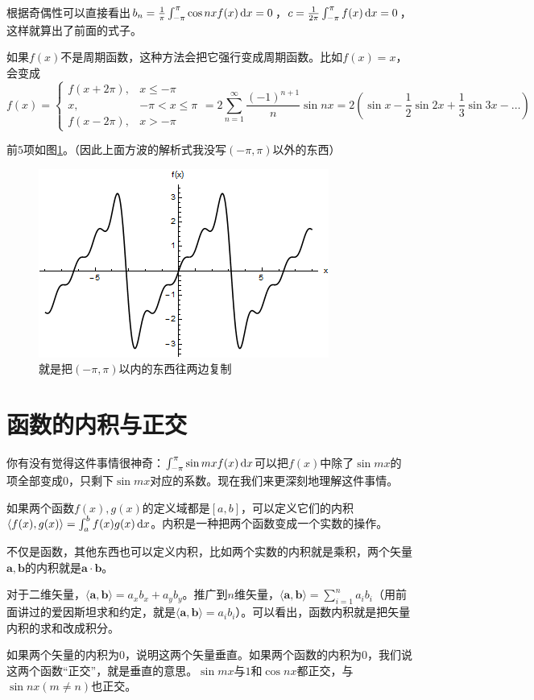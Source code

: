 根据奇偶性可以直接看出$b_n=\frac{1}{\pi} \int_{-\pi}^{\pi} \cos n x f(x) \mathop{}\!\mathrm{d} x=0$，$c=\frac{1}{2 \pi} \int_{-\pi}^{\pi} f(x) \mathop{}\!\mathrm{d} x=0$，这样就算出了前面的式子。

如果$f(x)$不是周期函数，这种方法会把它强行变成周期函数。比如$f(x)=x$，会变成
\begin{equation*}
f(x)=\begin{cases} f(x+2 \pi), &x \le -\pi \\ x, &-\pi<x \le \pi \\ f(x-2 \pi), &x>-\pi \end{cases}=2 \sum_{n=1}^{\infty} \frac{(-1)^{n+1}}{n} \sin n x=2(\sin x-\frac{1}{2} \sin 2 x+\frac{1}{3} \sin 3 x-\dots)
\end{equation*}

前$5$项如图\ref{fig-trigo-x}。（因此上面方波的解析式我没写$(-\pi,\pi)$以外的东西）
\begin{figure}[htb]
\centering
\includegraphics[width=0.33\linewidth]{fig/trigo-x.png}
\caption{就是把$(-\pi,\pi)$以内的东西往两边复制}
\label{fig-trigo-x}
\end{figure}
\section{函数的内积与正交}
你有没有觉得这件事情很神奇：$\int_{-\pi}^{\pi} \sin m x f(x) \mathop{}\!\mathrm{d} x$可以把$f(x)$中除了$\sin m x$的项全部变成$0$，只剩下$\sin m x$对应的系数。现在我们来更深刻地理解这件事情。

如果两个函数$f(x),g(x)$的定义域都是$[a,b]$，可以定义它们的内积$\langle f(x),g(x) \rangle=\int_a^b f(x) g(x) \mathop{}\!\mathrm{d} x$。内积是一种把两个函数变成一个实数的操作。

不仅是函数，其他东西也可以定义内积，比如两个实数的内积就是乘积，两个矢量$\mathbf{a},\mathbf{b}$的内积就是$\mathbf{a} \cdot \mathbf{b}$。

对于二维矢量，$\langle \mathbf{a},\mathbf{b} \rangle=a_x b_x+a_y b_y$。推广到$n$维矢量，$\langle \mathbf{a},\mathbf{b} \rangle=\sum_{i=1}^n a_i b_i$（用前面讲过的爱因斯坦求和约定，就是$\langle \mathbf{a},\mathbf{b} \rangle=a_i b_i$）。可以看出，函数内积就是把矢量内积的求和改成积分。

如果两个矢量的内积为$0$，说明这两个矢量垂直。如果两个函数的内积为$0$，我们说这两个函数“正交”，就是垂直的意思。$\sin m x$与$1$和$\cos n x$都正交，与$\sin n x(m \neq n)$也正交。

